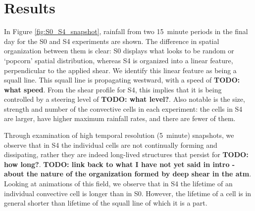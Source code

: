 \documentclass[11pt,a4paper]{article}
\newcommand\todo[1]{\textbf{TODO: #1}}
\begin{document}
\section{Results}

%

%
In Figure \ref{fig:S0_S4_snapshot}, rainfall from two \SI{15}{minute} periods in the final day for the S0 and S4 experiments are shown. The difference in spatial organization between them is clear: S0 displays what looks to be random or `popcorn' spatial distribution, whereas S4 is organized into a linear feature, perpendicular to the applied shear. We identify this linear feature as being a squall line. This squall line is propagating westward, with a speed of \todo{what speed}. From the shear profile for S4, this implies that it is being controlled by a steering level of \todo{what level?}. Also notable is the size, strength and number of the convective cells in each experiment: the cells in S4 are larger, have higher maximum rainfall rates, and there are fewer of them. 

Through examination of high temporal resolution (\SI{5}{minute}) snapshots, we observe that in S4 the individual cells are not continually forming and dissipating, rather they are indeed long-lived structures that persist for \todo{how long?}. \todo{link back to what I have not yet said in intro - about the nature of the organization formed by deep shear in the atm}. Looking at animations of this field, we observe that in S4 the lifetime of an individual convective cell is longer than in S0. However, the lifetime of a cell is in general shorter than lifetime of the squall line of which it is a part.
\end{document}

